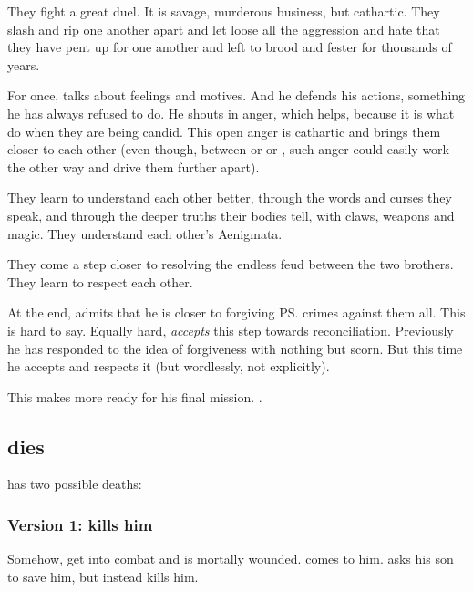 They fight a great duel. 
It is savage, murderous business, but cathartic. 
They slash and rip one another apart and let loose all the aggression and hate that they have pent up for one another and left to brood and fester for thousands of years. 

For once, \Ishnaruchaefir{} talks about feelings and motives. 
And he defends his actions, something he has always refused to do. 
He shouts in anger, which helps, because it is what \dragons{} do when they are being candid. 
This open anger is cathartic and brings them closer to each other (even though, between \resphain{} or \humans{} or \scathae, such anger could easily work the other way and drive them further apart). 

They learn to understand each other better, through the words and curses they speak, and through the deeper truths their bodies tell, with claws, weapons and magic. 
They understand each other's Aenigmata. 

They come a step closer to resolving the endless feud between the two brothers. 
They learn to respect each other. 

At the end, \Secherdamon{} admits that he is closer to forgiving \ps{\Ishnaruchaefir} crimes against them all. 
This is hard to say. 
Equally hard, \Ishnaruchaefir{} \emph{accepts} this step towards reconciliation. 
Previously he has responded to the idea of forgiveness with nothing but scorn. 
But this time he accepts and respects it (but wordlessly, not explicitly). 

This makes \Secherdamon{} more ready for his final mission. 
. 










\subsection{\Secherdamon{} dies}
\Secherdamon{} has two possible deaths: 





\subsubsection{Version 1: \Vizsherioch{} kills him}
Somehow, \Secherdamon{} get into combat and is mortally wounded. \Vizsherioch{} comes to him. 
\Secherdamon{} asks his son to save him, but \Vizsherioch{} instead kills him. 

